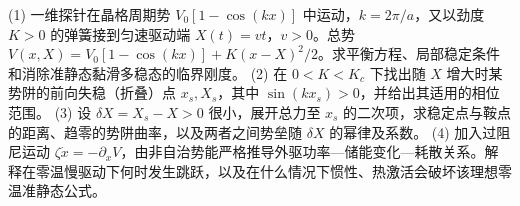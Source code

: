(1) 一维探针在晶格周期势 \(V_0[1-\cos(kx)]\) 中运动，\(k=2\pi/a\)，又以劲度 \(K>0\) 的弹簧接到匀速驱动端 \(X(t)=vt\)，\(v>0\)。总势 \(V(x,X)=V_0[1-\cos(kx)]+K(x-X)^2/2\)。求平衡方程、局部稳定条件和消除准静态黏滑多稳态的临界刚度。
(2) 在 \(0<K<K_c\) 下找出随 \(X\) 增大时某势阱的前向失稳（折叠）点 \(x_s,X_s\)，其中 \(\sin(kx_s)>0\)，并给出其适用的相位范围。
(3) 设 \(\delta X=X_s-X>0\) 很小，展开总力至 \(x_s\) 的二次项，求稳定点与鞍点的距离、趋零的势阱曲率，以及两者之间势垒随 \(\delta X\) 的幂律及系数。
(4) 加入过阻尼运动 \(\zeta\dot x=-\partial_xV\)，由非自治势能严格推导外驱功率—储能变化—耗散关系。解释在零温慢驱动下何时发生跳跃，以及在什么情况下惯性、热激活会破坏该理想零温准静态公式。
